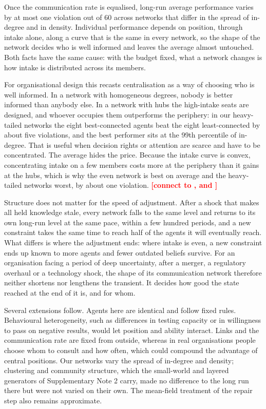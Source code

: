 \documentclass[11pt]{article}
\newcommand{\todo}[1]{\textcolor{red}{\textbf{[#1]}}}
\begin{document}
Once the communication rate is equalised, long-run average performance varies by at most one violation out of 60 across networks that differ in the spread of in-degree and in density. Individual performance depends on position, through intake alone, along a curve that is the same in every network, so the shape of the network decides who is well informed and leaves the average almost untouched. Both facts have the same cause: with the budget fixed, what a network changes is how intake is distributed across its members.

For organisational design this recasts centralisation as a way of choosing who is well informed. In a network with homogeneous degrees, nobody is better informed than anybody else. In a network with hubs the high-intake seats are designed, and whoever occupies them outperforms the periphery: in our heavy-tailed networks the eight best-connected agents beat the eight least-connected by about five violations, and the best performer sits at the 99th percentile of in-degree. That is useful when decision rights or attention are scarce and have to be concentrated. The average hides the price. Because the intake curve is convex, concentrating intake on a few members costs more at the periphery than it gains at the hubs, which is why the even network is best on average and the heavy-tailed networks worst, by about one violation. \todo{connect to \textcite{simon1962architecture}, \textcite{bolton1994firm} and \textcite{lazer2007network}}

Structure does not matter for the speed of adjustment. After a shock that makes all held knowledge stale, every network falls to the same level and returns to its own long-run level at the same pace, within a few hundred periods, and a new constraint takes the same time to reach half of the agents it will eventually reach. What differs is where the adjustment ends: where intake is even, a new constraint ends up known to more agents and fewer outdated beliefs survive. For an organisation facing a period of deep uncertainty, after a merger, a regulatory overhaul or a technology shock, the shape of its communication network therefore neither shortens nor lengthens the transient. It decides how good the state reached at the end of it is, and for whom.

Several extensions follow. Agents here are identical and follow fixed rules. Behavioural heterogeneity, such as differences in testing capacity or in willingness to pass on negative results, would let position and ability interact. Links and the communication rate are fixed from outside, whereas in real organisations people choose whom to consult and how often, which could compound the advantage of central positions. Our networks vary the spread of in-degree and density; clustering and community structure, which the small-world and layered generators of Supplementary Note 2 carry, made no difference to the long run there but were not varied on their own. The mean-field treatment of the repair step also remains approximate.
\end{document}
